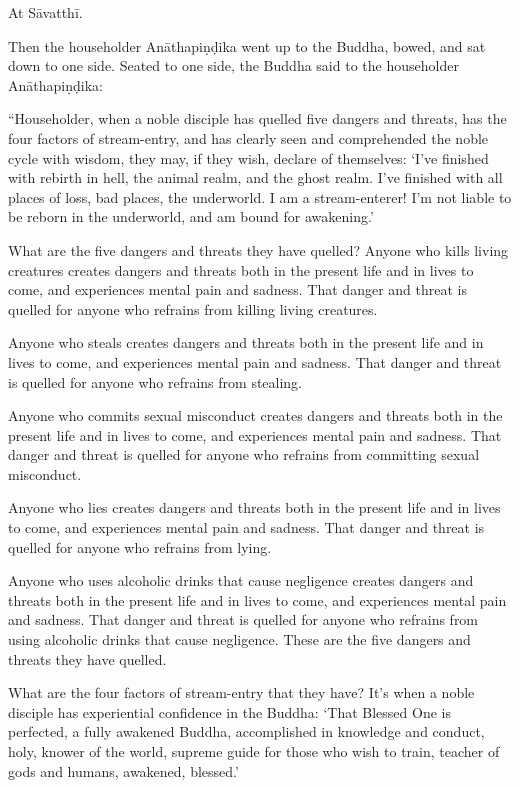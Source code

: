 \documentclass[12pt,openany]{book}%
\begin{document}
At \textsanskrit{Sāvatthī}. 

Then the householder \textsanskrit{Anāthapiṇḍika} went up to the Buddha, bowed, and sat down to one side. Seated to one side, the Buddha said to the householder \textsanskrit{Anāthapiṇḍika}: 

“Householder, when a noble disciple has quelled five dangers and threats, has the four factors of stream-entry, and has clearly seen and comprehended the noble cycle with wisdom, they may, if they wish, declare of themselves: ‘I’ve finished with rebirth in hell, the animal realm, and the ghost realm. I’ve finished with all places of loss, bad places, the underworld. I am a stream-enterer! I’m not liable to be reborn in the underworld, and am bound for awakening.’ 

What are the five dangers and threats they have quelled? Anyone who kills living creatures creates dangers and threats both in the present life and in lives to come, and experiences mental pain and sadness. That danger and threat is quelled for anyone who refrains from killing living creatures. 

Anyone who steals creates dangers and threats both in the present life and in lives to come, and experiences mental pain and sadness. That danger and threat is quelled for anyone who refrains from stealing. 

Anyone who commits sexual misconduct creates dangers and threats both in the present life and in lives to come, and experiences mental pain and sadness. That danger and threat is quelled for anyone who refrains from committing sexual misconduct. 

Anyone who lies creates dangers and threats both in the present life and in lives to come, and experiences mental pain and sadness. That danger and threat is quelled for anyone who refrains from lying. 

Anyone who uses alcoholic drinks that cause negligence creates dangers and threats both in the present life and in lives to come, and experiences mental pain and sadness. That danger and threat is quelled for anyone who refrains from using alcoholic drinks that cause negligence. These are the five dangers and threats they have quelled. 

What are the four factors of stream-entry that they have? It’s when a noble disciple has experiential confidence in the Buddha: ‘That Blessed One is perfected, a fully awakened Buddha, accomplished in knowledge and conduct, holy, knower of the world, supreme guide for those who wish to train, teacher of gods and humans, awakened, blessed.’ 
\end{document}
